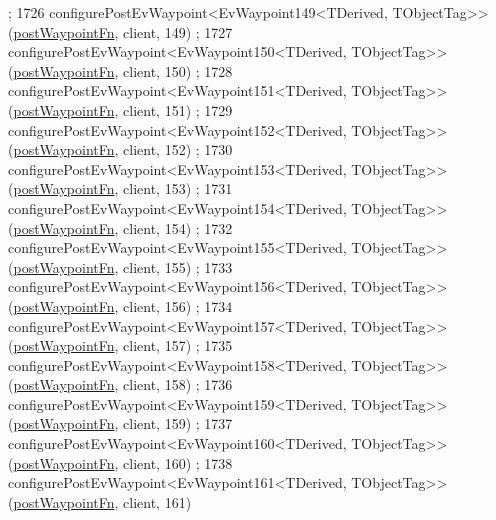 \begin{DoxyCode}
      ;
1726     configurePostEvWaypoint<EvWaypoint149<TDerived, TObjectTag>>(\hyperlink{classmove__base__z__client_1_1WaypointEventDispatcher_acc538eb7506c13f7cca2268a1742dadd}{postWaypointFn}, client, 149)
      ;
1727     configurePostEvWaypoint<EvWaypoint150<TDerived, TObjectTag>>(\hyperlink{classmove__base__z__client_1_1WaypointEventDispatcher_acc538eb7506c13f7cca2268a1742dadd}{postWaypointFn}, client, 150)
      ;
1728     configurePostEvWaypoint<EvWaypoint151<TDerived, TObjectTag>>(\hyperlink{classmove__base__z__client_1_1WaypointEventDispatcher_acc538eb7506c13f7cca2268a1742dadd}{postWaypointFn}, client, 151)
      ;
1729     configurePostEvWaypoint<EvWaypoint152<TDerived, TObjectTag>>(\hyperlink{classmove__base__z__client_1_1WaypointEventDispatcher_acc538eb7506c13f7cca2268a1742dadd}{postWaypointFn}, client, 152)
      ;
1730     configurePostEvWaypoint<EvWaypoint153<TDerived, TObjectTag>>(\hyperlink{classmove__base__z__client_1_1WaypointEventDispatcher_acc538eb7506c13f7cca2268a1742dadd}{postWaypointFn}, client, 153)
      ;
1731     configurePostEvWaypoint<EvWaypoint154<TDerived, TObjectTag>>(\hyperlink{classmove__base__z__client_1_1WaypointEventDispatcher_acc538eb7506c13f7cca2268a1742dadd}{postWaypointFn}, client, 154)
      ;
1732     configurePostEvWaypoint<EvWaypoint155<TDerived, TObjectTag>>(\hyperlink{classmove__base__z__client_1_1WaypointEventDispatcher_acc538eb7506c13f7cca2268a1742dadd}{postWaypointFn}, client, 155)
      ;
1733     configurePostEvWaypoint<EvWaypoint156<TDerived, TObjectTag>>(\hyperlink{classmove__base__z__client_1_1WaypointEventDispatcher_acc538eb7506c13f7cca2268a1742dadd}{postWaypointFn}, client, 156)
      ;
1734     configurePostEvWaypoint<EvWaypoint157<TDerived, TObjectTag>>(\hyperlink{classmove__base__z__client_1_1WaypointEventDispatcher_acc538eb7506c13f7cca2268a1742dadd}{postWaypointFn}, client, 157)
      ;
1735     configurePostEvWaypoint<EvWaypoint158<TDerived, TObjectTag>>(\hyperlink{classmove__base__z__client_1_1WaypointEventDispatcher_acc538eb7506c13f7cca2268a1742dadd}{postWaypointFn}, client, 158)
      ;
1736     configurePostEvWaypoint<EvWaypoint159<TDerived, TObjectTag>>(\hyperlink{classmove__base__z__client_1_1WaypointEventDispatcher_acc538eb7506c13f7cca2268a1742dadd}{postWaypointFn}, client, 159)
      ;
1737     configurePostEvWaypoint<EvWaypoint160<TDerived, TObjectTag>>(\hyperlink{classmove__base__z__client_1_1WaypointEventDispatcher_acc538eb7506c13f7cca2268a1742dadd}{postWaypointFn}, client, 160)
      ;
1738     configurePostEvWaypoint<EvWaypoint161<TDerived, TObjectTag>>(\hyperlink{classmove__base__z__client_1_1WaypointEventDispatcher_acc538eb7506c13f7cca2268a1742dadd}{postWaypointFn}, client, 161)

\end{DoxyCode}
